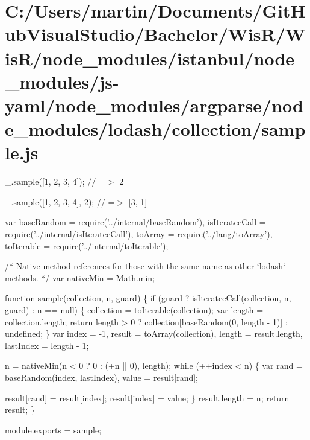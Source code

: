 \hypertarget{_c_1_2_users_2martin_2_documents_2_git_hub_visual_studio_2_bachelor_2_wis_r_2_wis_r_2node_module011729be51caac2cb4bcd9dae4b7475c}{}\section{C\+:/\+Users/martin/\+Documents/\+Git\+Hub\+Visual\+Studio/\+Bachelor/\+Wis\+R/\+Wis\+R/node\+\_\+modules/istanbul/node\+\_\+modules/js-\/yaml/node\+\_\+modules/argparse/node\+\_\+modules/lodash/collection/sample.\+js}
\+\_\+.\+sample(\mbox{[}1, 2, 3, 4\mbox{]}); // =$>$ 2

\+\_\+.\+sample(\mbox{[}1, 2, 3, 4\mbox{]}, 2); // =$>$ \mbox{[}3, 1\mbox{]}


\begin{DoxyCodeInclude}
var baseRandom = require(\textcolor{stringliteral}{'../internal/baseRandom'}),
    isIterateeCall = require(\textcolor{stringliteral}{'../internal/isIterateeCall'}),
    toArray = require(\textcolor{stringliteral}{'../lang/toArray'}),
    toIterable = require(\textcolor{stringliteral}{'../internal/toIterable'});

\textcolor{comment}{/* Native method references for those with the same name as other `lodash` methods. */}
var nativeMin = Math.min;

\textcolor{keyword}{function} sample(collection, n, guard) \{
  \textcolor{keywordflow}{if} (guard ? isIterateeCall(collection, n, guard) : n == null) \{
    collection = toIterable(collection);
    var length = collection.length;
    \textcolor{keywordflow}{return} length > 0 ? collection[baseRandom(0, length - 1)] : undefined;
  \}
  var index = -1,
      result = toArray(collection),
      length = result.length,
      lastIndex = length - 1;

  n = nativeMin(n < 0 ? 0 : (+n || 0), length);
  \textcolor{keywordflow}{while} (++index < n) \{
    var rand = baseRandom(index, lastIndex),
        value = result[rand];

    result[rand] = result[index];
    result[index] = value;
  \}
  result.length = n;
  \textcolor{keywordflow}{return} result;
\}

module.exports = sample;
\end{DoxyCodeInclude}
 